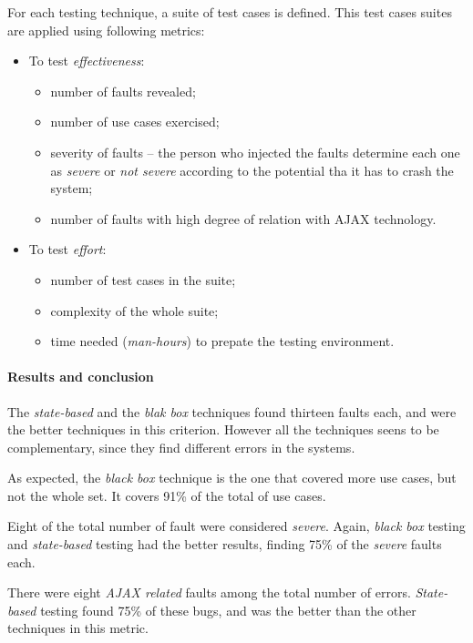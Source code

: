 \documentclass[a4paper]{article}
\begin{document}
For each testing technique, a suite of test cases is defined.
This test cases suites are applied using following metrics:

\begin{itemize}

\item To test \emph{effectiveness}:
\begin{itemize}
\item number of faults revealed;
\item number of use cases exercised;
\item severity of faults -- the person who injected the faults determine each one as \emph{severe} or \emph{not severe} according to the potential tha it has to crash the system;
\item number of faults with high degree of relation with AJAX technology.
\end{itemize}

\item To test \emph{effort}:
\begin{itemize}
\item number of test cases in the suite;
\item complexity of the whole suite;
\item time needed (\emph{man-hours}) to prepate the testing environment.
\end{itemize}

\end{itemize} 

\paragraph{Results and conclusion}

The \emph{state-based} and the \emph{blak box} techniques found thirteen faults each, and were the better techniques in this criterion.
However all the techniques seens to be complementary, since they find different errors in the systems.

As expected, the \emph{black box} technique is the one that covered more use cases, but not the whole set.
It covers 91\% of the total of use cases.

Eight of the total number of fault were considered \emph{severe}. Again, \emph{black box} testing and \emph{state-based} testing had the better results, finding 75\% of the \emph{severe} faults each.

There were eight \emph{AJAX related} faults among the total number of errors. 
\emph{State-based} testing found 75\% of these bugs, and was the better than the other techniques in this metric.
\end{document}
